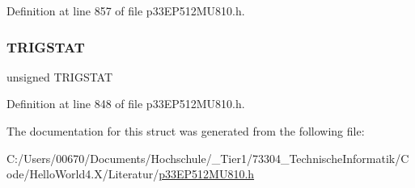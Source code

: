 Definition at line 857 of file p33\+E\+P512\+M\+U810.\+h.

\mbox{\label{structtag_i_c6_c_o_n2_b_i_t_s_ab379549de54ac93ad4aa73686c34cb7c}} 
\subsubsection{\texorpdfstring{T\+R\+I\+G\+S\+T\+AT}{TRIGSTAT}}
{\footnotesize\ttfamily unsigned T\+R\+I\+G\+S\+T\+AT}



Definition at line 848 of file p33\+E\+P512\+M\+U810.\+h.



The documentation for this struct was generated from the following file\+:\begin{DoxyCompactItemize}
\item 
C\+:/\+Users/00670/\+Documents/\+Hochschule/\+\_\+\+Tier1/73304\+\_\+\+Technische\+Informatik/\+Code/\+Hello\+World4.\+X/\+Literatur/\hyperlink{p33_e_p512_m_u810_8h}{p33\+E\+P512\+M\+U810.\+h}\end{DoxyCompactItemize}
